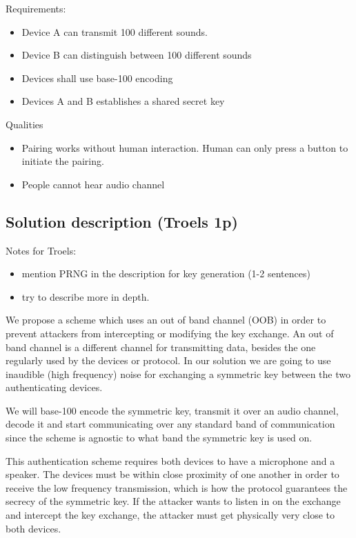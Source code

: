 \documentclass[12pt]{article}
\begin{document}
Requirements:
\begin{itemize}
\item Device A can transmit 100 different sounds.
\item Device B can distinguish between 100 different sounds
\item Devices shall use base-100 encoding
\item Devices A and B establishes a shared secret key
\end{itemize}

Qualities
\begin{itemize}
\item Pairing works without human interaction. Human can only press a button to initiate the pairing.
\item People cannot hear audio channel
\end{itemize}

\subsection{Solution description (Troels 1p)}
\label{sub:Solution description}

Notes for Troels:
\begin{itemize}
\item mention PRNG in the description for key generation (1-2 sentences)
\item try to describe more in depth.
\end{itemize}

We propose a scheme which uses an out of band channel (OOB) in order to prevent attackers from intercepting or modifying the key exchange. An out of band channel is a different channel for transmitting data, besides the one regularly used by the devices or protocol. In our solution we are going to use inaudible (high frequency) noise for exchanging a symmetric key between the two authenticating devices.

We will base-100 encode the symmetric key, transmit it over an audio channel, decode it and start communicating over any standard band of communication since the scheme is agnostic to what band the symmetric key is used on.

This authentication scheme requires both devices to have a microphone and a speaker.
The devices must be within close proximity of one another in order to receive the low frequency transmission, which is how the protocol guarantees the secrecy of the symmetric key. If the attacker wants to listen in on the exchange and intercept the key exchange, the attacker must get physically very close to both devices.
\end{document}
